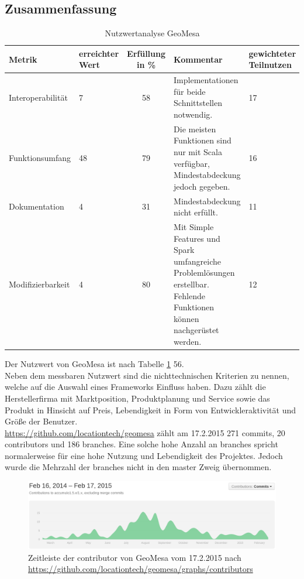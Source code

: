 \subsection{Zusammenfassung}
\begin{table}[h!]
\centering
\small
\begin{tabular}{l|p{1.8cm}|c|p{3.1cm}|p{1.8cm}}
\textbf{Metrik} & \textbf{erreichter Wert} & \textbf{Erfüllung in \%} & \textbf{Kommentar} & \textbf{gewichteter Teilnutzen} \\ \hline
Interoperabilität & 7 & 58 & Implementationen für beide Schnittstellen notwendig. & 17 \\ \hline
Funktionsumfang & 48 & 79 & Die meisten Funktionen sind nur mit Scala verfügbar, Mindestabdeckung jedoch gegeben. & 16 \\ \hline
Dokumentation & 4 & 31 & Mindestabdeckung nicht erfüllt. & 11 \\ \hline
Modifizierbarkeit & 4 & 80 & Mit Simple Features und Spark umfangreiche Problemlösungen erstellbar. Fehlende Funktionen können nachgerüstet werden. & 12 \\
\end{tabular}
\caption{Nutzwertanalyse GeoMesa}
\label{table:nutzwertanalyse-geomesa}
\end{table}
Der Nutzwert von GeoMesa ist nach Tabelle \ref{table:nutzwertanalyse-geomesa} 56.\\
Neben dem messbaren Nutzwert sind die nichttechnischen Kriterien zu nennen, welche auf die Auswahl eines Frameworks Einfluss haben.
Dazu zählt die Herstellerfirma mit Marktposition, Produktplanung und Service sowie das Produkt in Hinsicht auf Preis, Lebendigkeit in Form von Entwickleraktivität und Größe der Benutzer.\\
\url{https://github.com/locationtech/geomesa} zählt am 17.2.2015 271 commits, 20 contributors und 186 branches.
Eine solche hohe Anzahl an branches spricht normalerweise für eine hohe Nutzung und Lebendigkeit des Projektes.
Jedoch wurde die Mehrzahl der branches nicht in den master Zweig übernommen.
\begin{figure}[h!]
\centering
\includegraphics[width=\textwidth]{Abbildungen/geomesa_timeline_contributors.png}
\caption[Zeitleiste der contributor von GeoMesa]{Zeitleiste der contributor von GeoMesa vom 17.2.2015 nach \url{https://github.com/locationtech/geomesa/graphs/contributors}}
\label{fig:timeline_contr_geomesa}
\end{figure}
